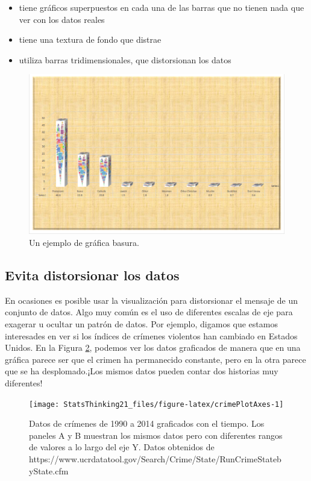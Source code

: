 \documentclass[
  12pt,
]{book}
\providecommand{\tightlist}{%
  \setlength{\itemsep}{0pt}\setlength{\parskip}{0pt}}
\begin{document}
\begin{itemize}
\tightlist
\item
  tiene gráficos superpuestos en cada una de las barras que no tienen nada que ver con los datos reales
\item
  tiene una textura de fondo que distrae
\item
  utiliza barras tridimensionales, que distorsionan los datos
\end{itemize}

\begin{figure}
\includegraphics[width=0.8\linewidth,height=0.5\textheight]{images/excel_chartjunk} \caption{Un ejemplo de gráfica basura.}\label{fig:chartJunk}
\end{figure}

\hypertarget{evita-distorsionar-los-datos}{%
\subsection{Evita distorsionar los datos}\label{evita-distorsionar-los-datos}}

En ocasiones es posible usar la visualización para distorsionar el mensaje de un conjunto de datos. Algo muy común es el uso de diferentes escalas de eje para exagerar u ocultar un patrón de datos. Por ejemplo, digamos que estamos interesades en ver si los índices de crímenes violentos han cambiado en Estados Unidos. En la Figura \ref{fig:crimePlotAxes}, podemos ver los datos graficados de manera que en una gráfica parece ser que el crimen ha permanecido constante, pero en la otra parece que se ha desplomado.¡Los mismos datos pueden contar dos historias muy diferentes!

\begin{figure}
\texttt{[image: StatsThinking21\_files/figure-latex/crimePlotAxes-1]} \caption{Datos de crímenes de 1990 a 2014 graficados con el tiempo. Los paneles A y B muestran los mismos datos pero con diferentes rangos de valores a lo largo del eje Y. Datos obtenidos de https://www.ucrdatatool.gov/Search/Crime/State/RunCrimeStatebyState.cfm}\label{fig:crimePlotAxes}
\end{figure}
\end{document}
